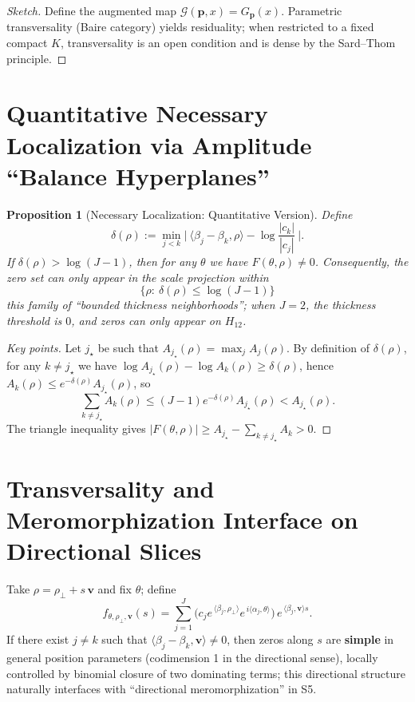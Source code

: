 \documentclass[11pt,a4paper]{article}
\newtheorem{proposition}[theorem]{Proposition}
\theoremstyle{remark}
\begin{document}
\begin{proof}[Sketch]
Define the augmented map $\mathscr{G}(\mathbf{p},x)=G_{\mathbf{p}}(x)$. Parametric transversality (Baire category) yields residuality; when restricted to a fixed compact $K$, transversality is an open condition and is dense by the Sard--Thom principle.
\end{proof}

\section{Quantitative Necessary Localization via Amplitude ``Balance Hyperplanes''}

\begin{proposition}[Necessary Localization: Quantitative Version]\label{prop:localization}
Define
\begin{equation}
\delta(\rho):=\min_{j<k}\Big|\ \langle\beta_j-\beta_k,\rho\rangle-\log\frac{|c_k|}{|c_j|}\ \Big|.
\end{equation}
If $\delta(\rho)>\log(J-1)$, then for any $\theta$ we have $F(\theta,\rho)\ne0$. Consequently, the zero set can only appear in the scale projection within
\begin{equation}
\{\rho:\ \delta(\rho)\le \log(J-1)\}
\end{equation}
this family of ``bounded thickness neighborhoods''; when $J=2$, the thickness threshold is $0$, and zeros can only appear on $H_{12}$.
\end{proposition}

\begin{proof}[Key points]
Let $j_\star$ be such that $A_{j_\star}(\rho)=\max_j A_j(\rho)$. By definition of $\delta(\rho)$, for any $k\ne j_\star$ we have
$\log A_{j_\star}(\rho)-\log A_k(\rho)\ge \delta(\rho)$, hence $A_k(\rho)\le e^{-\delta(\rho)}A_{j_\star}(\rho)$, so
\begin{equation}
\sum_{k\ne j_\star}A_k(\rho)\le (J-1)e^{-\delta(\rho)}A_{j_\star}(\rho)
< A_{j_\star}(\rho).
\end{equation}
The triangle inequality gives $|F(\theta,\rho)|\ge A_{j_\star}-\sum_{k\ne j_\star}A_k>0$.
\end{proof}

\section{Transversality and Meromorphization Interface on Directional Slices}

Take $\rho=\rho_\perp+s\,\mathbf{v}$ and fix $\theta$; define
\begin{equation}
f_{\theta,\rho_\perp,\mathbf{v}}(s)
=\sum_{j=1}^J \big(c_j e^{\,\langle\beta_j,\rho_\perp\rangle}e^{\,i\langle\alpha_j,\theta\rangle}\big)\,e^{\,\langle\beta_j,\mathbf{v}\rangle s}.
\end{equation}
If there exist $j\ne k$ such that $\langle\beta_j-\beta_k,\mathbf{v}\rangle\ne0$, then zeros along $s$ are \textbf{simple} in general position parameters (codimension 1 in the directional sense), locally controlled by binomial closure of two dominating terms; this directional structure naturally interfaces with ``directional meromorphization'' in S5.
\end{document}
